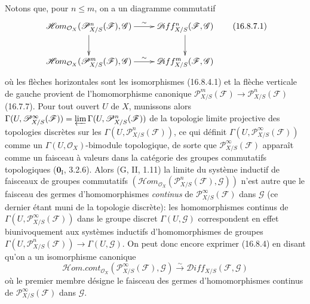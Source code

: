 \begin{env}[16.8.7]
Notons que, pour $n\leq m$, on a un diagramme commutatif
\[
  \xymatrix{
    \mathscr{H}\!om_{\mathcal{O}_X}
      (\mathscr{P}_{X/S}^n(\mathscr{F}),\mathscr{G})
      \ar[r]^-{\sim}\ar[d]
      &\mathscr{D}\!iff_{X/S}^n(\mathscr{F},\mathscr{G})\ar[d]\\
    \mathscr{H}\!om_{\mathcal{O}_X}
      (\mathscr{P}_{X/S}^m(\mathscr{F}),\mathscr{G})
      \ar[r]^-{\sim}
      &\mathscr{D}\!iff_{X/S}^m(\mathscr{F},\mathscr{G})
  }
  \tag{16.8.7.1}
  \label{IV.16.8.7.1}
\]
où les flèches horizontales sont les isomorphismes (16.8.4.1) et la flèche
verticale de gauche provient de l'homomorphisme canonique
$\mathscr{P}_{X/S}^m(\mathscr{F})\to
\mathscr{P}_{X/S}^n(\mathscr{F})$ (16.7.7). Pour tout ouvert $U$ de $X$,
munissons alors
$\Gamma(U,\mathscr{P}_{X/S}^{\infty}(\mathscr{F}))=\varprojlim\Gamma(U,\mathscr{P}_{X/S}^n(\mathscr{F}))$
de la topologie limite projective des topologies discrètes sur les
$\Gamma(U,\mathscr{P}_{X/S}^n(\mathscr{F}))$, ce qui définit
$\Gamma(U,\mathscr{P}_{X/S}^{\infty}(\mathscr{F}))$ comme un
$\Gamma(U,\mathcal{O}_X)$-bimodule topologique, de sorte que
$\mathscr{P}_{X/S}^{\infty}(\mathscr{F})$ apparaît comme un faisceau à valeurs
dans la catégorie des groupes commutatifs topologiques
($\mathbf{0}_{\mathrm I}$, 3.2.6). Alors (G, II, 1.11) la limite du système inductif
de faisceaux de groupes commutatifs
$(\mathscr{H}\!om_{\mathcal{O}_X}(\mathscr{P}_{X/S}^n(\mathscr{F}),\mathscr{G}))$
n'est autre que le faisceau des germes d'homomorphismes \emph{continus} de
$\mathscr{P}_{X/S}^{\infty}(\mathscr{F})$ dans $\mathscr{G}$ (ce dernier
étant muni de la topologie discrète): les homomorphismes continus de
$\Gamma(U,\mathscr{P}_{X/S}^{\infty}(\mathscr{F}))$ dans le groupe discret
$\Gamma(U,\mathscr{G})$ correspondent en effet biunivoquement aux systèmes
inductifs d'homomorphismes de groupes
$\Gamma(U,\mathscr{P}_{X/S}^n(\mathscr{F}))\to\Gamma(U,\mathscr{G})$. On peut
donc encore exprimer (16.8.4) en disant qu'on a un isomorphisme canonique
\[
  \mathscr{H}\!om.\mathit{cont}_{\mathcal{O}_X}
  (\mathscr{P}_{X/S}^{\infty}(\mathscr{F}),\mathscr{G})
  \xrightarrow{\sim}
  \mathscr{D}\!iff_{X/S}(\mathscr{F},\mathscr{G})
\]
où le premier membre désigne le faisceau des germes d'homomorphismes continus
de $\mathscr{P}_{X/S}^{\infty}(\mathscr{F})$ dans $\mathscr{G}$.
\end{env}


